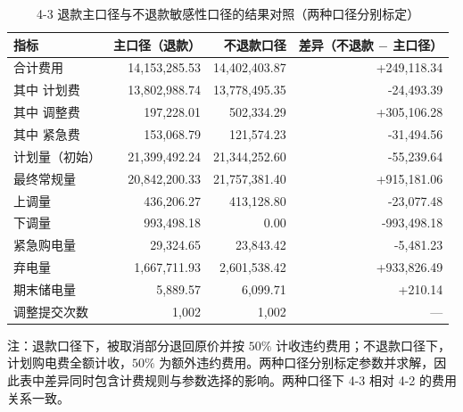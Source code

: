 
\begin{table}[htbp]
  \centering
  \caption{4-3 退款主口径与不退款敏感性口径的结果对照（两种口径分别标定）}
  \label{tab:p4-refund}
  \small
  \begin{tabular}{lrrr}
    \toprule
    指标 & 主口径（退款） & 不退款口径 & 差异（不退款 $-$ 主口径） \\
    \midrule
    合计费用 & 14,153,285.53 & 14,402,403.87 & +249,118.34 \\
    其中 计划费 & 13,802,988.74 & 13,778,495.35 & -24,493.39 \\
    其中 调整费 & 197,228.01 & 502,334.29 & +305,106.28 \\
    其中 紧急费 & 153,068.79 & 121,574.23 & -31,494.56 \\
    计划量（初始） & 21,399,492.24 & 21,344,252.60 & -55,239.64 \\
    最终常规量 & 20,842,200.33 & 21,757,381.40 & +915,181.06 \\
    上调量 & 436,206.27 & 413,128.80 & -23,077.48 \\
    下调量 & 993,498.18 & 0.00 & -993,498.18 \\
    紧急购电量 & 29,324.65 & 23,843.42 & -5,481.23 \\
    弃电量 & 1,667,711.93 & 2,601,538.42 & +933,826.49 \\
    期末储电量 & 5,889.57 & 6,099.71 & +210.14 \\
    调整提交次数 & 1,002 & 1,002 & --- \\
    \bottomrule
  \end{tabular}
  \par\vspace{2pt}
  \begin{minipage}{\textwidth}\footnotesize
    注：退款口径下，被取消部分退回原价并按 $50\%$ 计收违约费用；不退款口径下，计划购电费全额计收，$50\%$ 为额外违约费用。两种口径分别标定参数并求解，因此表中差异同时包含计费规则与参数选择的影响。两种口径下 4-3 相对 4-2 的费用关系一致。
  \end{minipage}
\end{table}
